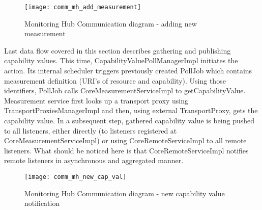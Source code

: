 \begin{figure}[ht]
\centering
\texttt{[image: comm\_mh\_add\_measurement]}
\caption{Monitoring Hub Communication diagram - adding new measurement}
\label{fig:comm_mh_add_measurement}
\end{figure}

Last data flow covered in this section describes gathering and publishing capability values. This time, CapabilityValuePollManagerImpl initiates the action. Its internal scheduler triggers previously created PollJob which contains measurement definition (URI's of resource and capability). Using those identifiers, PollJob calls CoreMeasurementServiceImpl to getCapabilityValue. Measurement service first looks up a transport proxy using TransportProxiesManagerImpl and then, using external TransportProxy, gets the capability value. In a subsequent step, gathered capability value is being pushed to all listeners, either directly (to listeners registered at CoreMeasurementServiceImpl) or using CoreRemoteServiceImpl to all remote listeners. What should be noticed here is that CoreRemoteServiceImpl notifies remote listeners in asynchronous and aggregated manner.

\begin{figure}[ht]
\centering
\texttt{[image: comm\_mh\_new\_cap\_val]}
\caption{Monitoring Hub Communication diagram - new capability value notification}
\label{fig:comm_new_cap_val}
\end{figure}
\pagebreak
